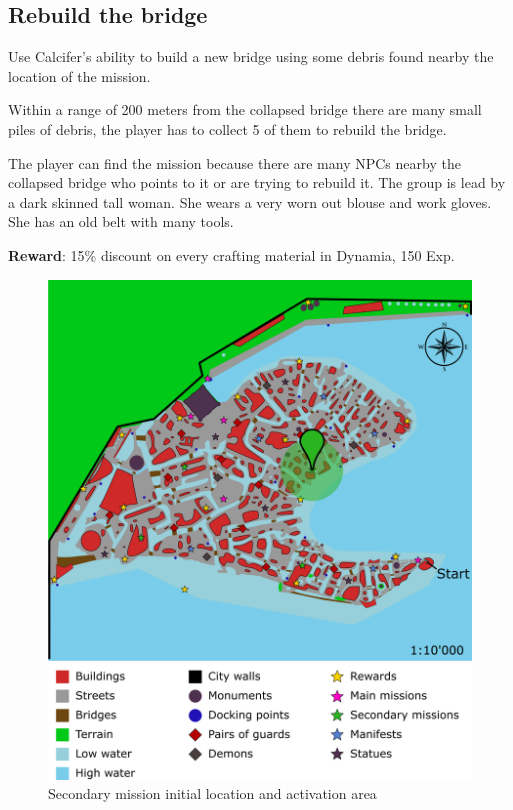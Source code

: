 \subsection{Rebuild the bridge}
Use Calcifer's ability to build a new bridge using some debris found nearby the location of the mission.

Within a range of 200 meters from the collapsed bridge there are many small piles of debris, the player has to collect 5 of them to rebuild the bridge.

The player can find the mission because there are many NPCs nearby the collapsed bridge who points to it or are trying to rebuild it. The group is lead by a dark skinned tall woman. She wears a very worn out blouse and work gloves. She has an old belt with many tools.

\textbf{Reward}: 15\% discount on every crafting material in Dynamia, 150 Exp.

\begin{figure}[H]
  \centering
  \includegraphics[width=\textwidth]{../Images/Maps/dynamiaSecondaryMissions_Bridge}
  \caption{Secondary mission initial location and activation area}
\end{figure}

